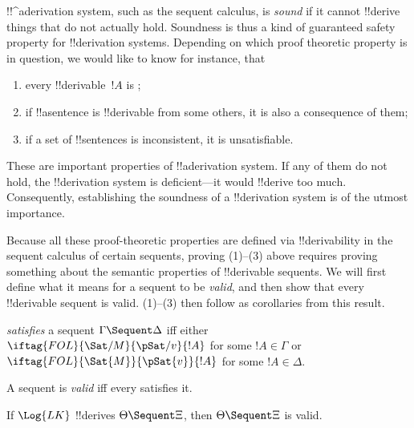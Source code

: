 \documentclass[../../../include/open-logic-section]{subfiles}
\begin{document}
      {}
      {}

\begin{explain}
!!^a{derivation} system, such as the sequent calculus, is \emph{sound}
if it cannot !!{derive} things that do not actually hold.  Soundness is
thus a kind of guaranteed safety property for !!{derivation} systems.
Depending on which proof theoretic property is in question, we would
like to know for instance, that
\begin{enumerate}
\item every !!{derivable}~$!A$ is ;
\item if !!a{sentence} is !!{derivable} from some others, it is also a
  consequence of them;
\item if a set of !!{sentence}s is inconsistent, it is unsatisfiable.
\end{enumerate}
These are important properties of !!a{derivation} system.  If any of
them do not hold, the !!{derivation} system is deficient---it would
!!{derive} too much.  Consequently, establishing the soundness of a
!!{derivation} system is of the utmost importance.

Because all these proof-theoretic properties are defined via
!!{derivability} in the sequent calculus of certain sequents, proving
(1)--(3) above requires proving something about the semantic
properties of !!{derivable} sequents.  We will first define what it
means for a sequent to be \emph{valid}, and then show that every
!!{derivable} sequent is valid.  (1)--(3) then follow as corollaries
from this result.
\end{explain}

\begin{defn}
 \emph{satisfies} a sequent
$\Gamma \Sequent \Delta$ iff either
$\iftag{FOL}{\Sat/{M}}{\pSat/{v}}{!A}$ for some $!A \in \Gamma$ or
$\iftag{FOL}{\Sat{M}}{\pSat{v}}{!A}$ for some $!A \in \Delta$.

A sequent is \emph{valid} iff every  satisfies it.
\end{defn}

\begin{thm}[Soundness]
 If $\Log{LK}$ !!{derive}s $\Theta
\Sequent \Xi$, then $\Theta \Sequent \Xi$ is valid.
\end{thm}
\end{document}
